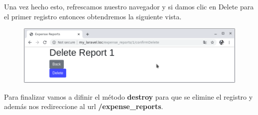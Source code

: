 \documentclass{article}
\begin{document}
Una vez hecho esto, refrescamos nuestro navegador y si damos clic en Delete
para el primer registro entonces obtendremos la siguiente vista.

\begin{figure}[h!]
  \centering
  \includegraphics[scale=0.5]{./Pictures/079_confirm_delete1.png}
\end{figure}

Para finalizar vamos a difinir el método \textbf{destroy} para que se elimine
el registro y además nos redireccione al url \textbf{/expense\_reports}.\\
\end{document}
